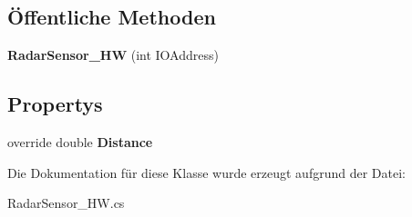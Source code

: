 \subsection*{Öffentliche Methoden}
\begin{DoxyCompactItemize}
\item 
\hypertarget{class_robot_ctrl_1_1_radar_sensor___h_w_a7730198b6097b06b30539165d3ca4953}{
{\bfseries RadarSensor\_\-HW} (int IOAddress)}
\label{class_robot_ctrl_1_1_radar_sensor___h_w_a7730198b6097b06b30539165d3ca4953}

\end{DoxyCompactItemize}
\subsection*{Propertys}
\begin{DoxyCompactItemize}
\item 
\hypertarget{class_robot_ctrl_1_1_radar_sensor___h_w_a0eb1060a6e45bb29fdbf99e35481311e}{
override double {\bfseries Distance}}
\label{class_robot_ctrl_1_1_radar_sensor___h_w_a0eb1060a6e45bb29fdbf99e35481311e}

\end{DoxyCompactItemize}


Die Dokumentation für diese Klasse wurde erzeugt aufgrund der Datei:\begin{DoxyCompactItemize}
\item 
RadarSensor\_\-HW.cs\end{DoxyCompactItemize}
